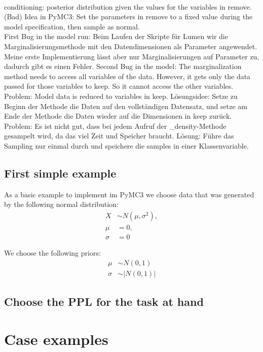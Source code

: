 \documentclass{article}
\begin{document}
\\
conditioning: posterior distribution given the values for the variables in remove. (Bad) Idea in PyMC3: Set the parameters in remove to a fixed value during the model specification, then sample as normal.
\\
First Bug in the model run: Beim Laufen der Skripte für Lumen wir die Marginalisierungsmethode mit den Datendimensionen als Parameter angewendet. Meine erste Implementierung lässt aber nur Marginalisierungen auf Parameter zu, dadurch gibt es einen Fehler.
Second Bug in the model: The marginalization method needs to access all variables of the data. However, it gets only the data passed for those variables to keep. So it cannot access the other variables. 
Problem: Model data is reduced to variables in keep. Lösungsidee: Setze zu Beginn der Methode die Daten auf den vollständigen Datensatz, und setze am Ende der Methode die Daten wieder auf die Dimensionen in keep zurück.
\\
Problem: Es ist nicht gut, dass bei jedem Aufruf der \_density-Methode gesampelt wird, da das viel Zeit und Speicher braucht. Lösung: Führe das Sampling nur einmal durch und speichere die samples in einer Klassenvariable.
\subsection{First simple example}
As a basic example to implement im PyMC3 we choose data that was generated by the following normal distribution:
\begin{equation}
\begin{split}
	X &\sim N(\mu,\sigma^2), \\
	\mu &= 0, \\
	\sigma &= 0
\end{split}
\end{equation}

We choose the following priors:
\begin{equation}
\begin{split}
\mu &\sim N(0,1) \\
\sigma &\sim |N(0,1)|
\end{split}
\end{equation}

\subsection{Choose the PPL for the task at hand}

\section{Case examples}
\end{document}
